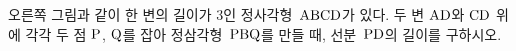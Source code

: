 \noindent\begin{minipage}[t]{0.58\linewidth}\vspace{0pt}\raggedright 오른쪽 그림과 같이 한 변의 길이가 $3$인 정사각형~$\mathrm{ABCD}$가 있다. 두 변 $\mathrm{AD}$와 $\mathrm{CD}$ 위에 각각 두 점 $\mathrm{P}$, $\mathrm{Q}$를 잡아 정삼각형~$\mathrm{PBQ}$를 만들 때, 선분~$\mathrm{PD}$의 길이를 구하시오.\end{minipage}\hfill\begin{minipage}[t]{0.4\linewidth}\vspace{0pt}\centering \resizebox{\ifdim\width>\linewidth\linewidth\else\width\fi}{!}{}\end{minipage}\par
